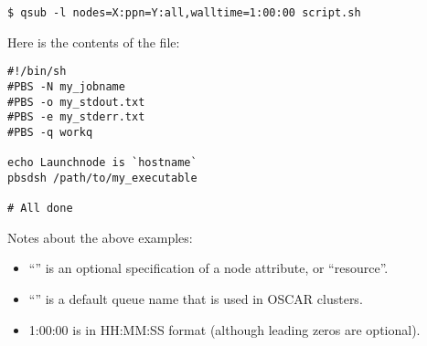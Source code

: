 \begin{verbatim}
$ qsub -l nodes=X:ppn=Y:all,walltime=1:00:00 script.sh
\end{verbatim}

Here is the contents of the  file:

\begin{verbatim}
#!/bin/sh
#PBS -N my_jobname
#PBS -o my_stdout.txt
#PBS -e my_stderr.txt
#PBS -q workq

echo Launchnode is `hostname`
pbsdsh /path/to/my_executable

# All done
\end{verbatim}

Notes about the above examples:
\begin{itemize} 
\item``'' is an optional specification of a node attribute,
  or ``resource''.
  
\item ``'' is a default queue name that is used in OSCAR
  clusters.
  
\item 1:00:00 is in HH:MM:SS format (although leading zeros are optional).

\end{itemize}

